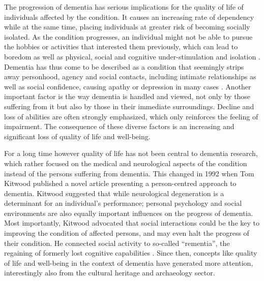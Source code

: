 	The progression of dementia has serious implications for the quality of life of individuals affected by the condition. It causes an increasing rate of dependency while at the same time, placing individuals at greater risk of becoming socially isolated. As the condition progresses, an individual might not be able to pursue the hobbies or activities that interested them previously, which can lead to boredom as well as physical, social and cognitive under-stimulation and isolation \parencite{Society_2013}. Dementia has thus come to be described as a condition that seemingly strips away personhood, agency and social contacts, including intimate relationships as well as social confidence, causing apathy or depression in many cases \parencite[274,284]{Kitwood_1992}. Another important factor is the way dementia is handled and viewed, not only by those suffering from it but also by those in their immediate surroundings. Decline and loss of abilities are often strongly emphasized, which only reinforces the feeling of impairment. The consequence of these diverse factors is an increasing and significant loss of quality of life and well-being.		
	
	For a long time however quality of life has not been central to dementia research, which rather focused on the medical and neurological aspects of the condition instead of the persons suffering from dementia. This changed in 1992 when Tom Kitwood published a novel article presenting a person-centred approach to dementia. Kitwood suggested that while neurological degeneration is a determinant for an individual’s performance; personal psychology and social environments are also equally important influences on the progress of dementia. Most importantly, Kitwood advocated that social interactions could be the key to improving the condition of affected persons, and may even halt the progress of their condition. He connected social activity to so-called “rementia”, the regaining of formerly lost cognitive capabilities \parencite[271,280]{Kitwood_1992}. Since then, concepts like quality of life and well-being in the context of dementia have generated more attention, interestingly also from the cultural heritage and archaeology sector.	
	
	
